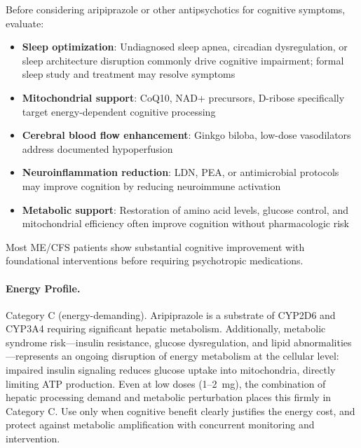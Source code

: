 Before considering aripiprazole or other antipsychotics for cognitive symptoms, evaluate:
\begin{itemize}
    \item \textbf{Sleep optimization}: Undiagnosed sleep apnea, circadian dysregulation, or sleep architecture disruption commonly drive cognitive impairment; formal sleep study and treatment may resolve symptoms
    \item \textbf{Mitochondrial support}: CoQ10, NAD+ precursors, D-ribose specifically target energy-dependent cognitive processing
    \item \textbf{Cerebral blood flow enhancement}: Ginkgo biloba, low-dose vasodilators address documented hypoperfusion
    \item \textbf{Neuroinflammation reduction}: LDN, PEA, or antimicrobial protocols may improve cognition by reducing neuroimmune activation
    \item \textbf{Metabolic support}: Restoration of amino acid levels, glucose control, and mitochondrial efficiency often improve cognition without pharmacologic risk
\end{itemize}

Most ME/CFS patients show substantial cognitive improvement with foundational interventions before requiring psychotropic medications.

\paragraph{Energy Profile.}
Category C (energy-demanding). Aripiprazole is a substrate of CYP2D6 and CYP3A4 requiring significant hepatic metabolism. Additionally, metabolic syndrome risk---insulin resistance, glucose dysregulation, and lipid abnormalities---represents an ongoing disruption of energy metabolism at the cellular level: impaired insulin signaling reduces glucose uptake into mitochondria, directly limiting ATP production. Even at low doses (1--2~mg), the combination of hepatic processing demand and metabolic perturbation places this firmly in Category C. Use only when cognitive benefit clearly justifies the energy cost, and protect against metabolic amplification with concurrent monitoring and intervention.

